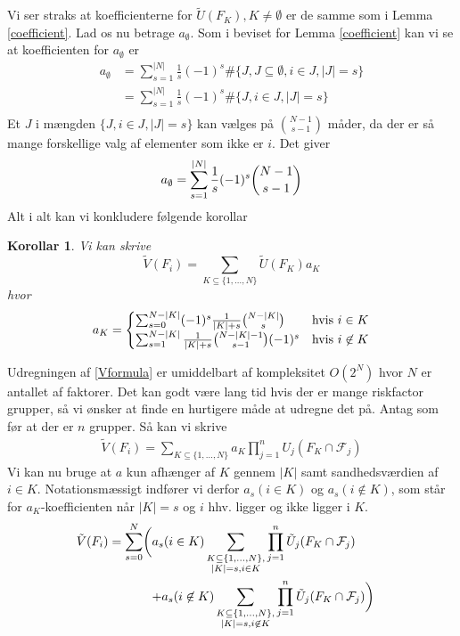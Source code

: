 \documentclass[a4paper, 12pt]{article}
\newtheorem{korollar}{Korollar}
\begin{document}
Vi ser straks at koefficienterne for $\tilde U(F_K), K\neq \emptyset$ er de samme som i Lemma \ref{coefficient}. Lad os nu betrage $a_{\emptyset}$. Som i beviset for Lemma \ref{coefficient} kan vi se at koefficienten for $a_{\emptyset}$ er 
\begin{align*}
a_{\emptyset}&=\sum_{s=1}^{|N|}\frac{1}{s}(-1)^{s} \#\{J, J\subseteq \emptyset, i\in J, |J|=s \}\\
&=\sum_{s=1}^{|N|}\frac{1}{s}(-1)^{s} \#\{J, i\in J, |J|=s \}\\
\end{align*}
Et $J$ i mængden $\{J, i\in J, |J|=s \}$ kan vælges på ${N-1 \choose s-1}$ måder, da der er så mange forskellige valg af elementer som ikke er $i$. Det giver
\begin{equation}
a_{\emptyset}=\sum_{s=1}^{|N|}\frac{1}{s}(-1)^{s} {N-1 \choose s-1} \\
\end{equation}
Alt i alt kan vi konkludere følgende korollar
\begin{korollar}\label{coefficient_tilde}
Vi kan skrive
\begin{equation}
\tilde V(F_i)=\sum_{K\subseteq \{1, \dots, N\}} \tilde U(F_K)a_K \label{Vformula}
\end{equation}
hvor 
\begin{equation}
a_K=\begin{cases} \sum_{s=0}^{N-|K|} (-1)^s \frac{1}{|K|+s}{N-|K|\choose s} \quad &\textup{hvis } i\in K\\
\sum_{s=1}^{N-|K|}\frac{1}{|K|+s}{N-|K|-1 \choose s-1} (-1)^s &\textup{hvis } i\not\in K
\end{cases}
\end{equation}
\end{korollar}
Udregningen af \eqref{Vformula} er umiddelbart af kompleksitet $O(2^N)$ hvor $N$ er antallet af faktorer. Det kan godt være lang tid hvis der er mange riskfactor grupper, så vi ønsker at finde en hurtigere måde at udregne det på. Antag som før at der er $n$ grupper. Så kan vi skrive
\begin{align*}
\tilde V(F_i)=\sum_{K\subseteq \{1, \dots, N\}} a_K \prod_{j=1}^n U_j(F_K\cap \mathcal F_j)
\end{align*}
Vi kan nu bruge at $a$ kun afhænger af $K$ gennem $|K|$ samt sandhedsværdien af $i\in K$. Notationsmæssigt indfører vi derfor $a_{s}(i\in K)$ og $a_s(i\not\in K)$, som står for $a_K$-koefficienten når $|K|=s$ og $i$ hhv. ligger og ikke ligger i $K$. 
\begin{align}
\tilde V(F_i)&=\sum_{s=0}^N \biggl(\begin{lgathered}[t]a_s(i\in K) \sum_{\substack{K\subseteq \{1, \dots, N\},\\ |K|=s,
i\in K}}\prod_{j=1}^n \tilde U_j(F_K\cap \mathcal F_j)\\
+a_s(i\not\in K) \sum_{\substack{K\subseteq \{1, \dots, N\},\\ |K|=s,
i\not\in K}}\prod_{j=1}^n \tilde  U_j(F_K\cap \mathcal F_j)\biggr)\end{lgathered}
\end{align}
\end{document}
